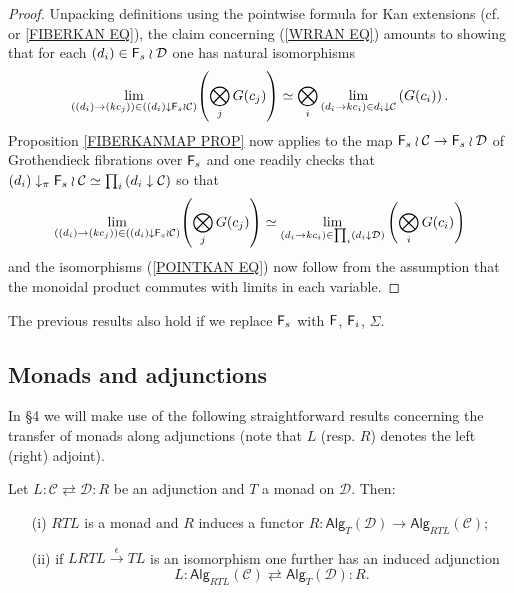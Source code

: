 \documentclass[a4paper,10pt]{article}%
\begin{document}
\begin{proof}
	Unpacking definitions using the pointwise formula for Kan extensions (cf. \cite[X.3 Thm. 1]{McL} or \eqref{FIBERKAN EQ}), the claim concerning (\ref{WRRAN EQ}) amounts to showing that for each $(d_i) \in \mathsf{F}_s \wr \mathcal{D}$ one has natural isomorphisms
	\begin{equation}\label{POINTKAN EQ}
	\underset{((d_i) \to (kc_j))\in
	\left( (d_i) \downarrow \mathsf{F}_s \wr \mathcal{C} \right) }{\lim} {\left(\bigotimes_j{G(c_j)}\right)}
		\simeq	
	\bigotimes_i \underset{(d_i  \to kc_i) \in d_i \downarrow \mathcal{C}}{\lim}
	\left(G(c_i)\right).
	\end{equation}
Proposition \ref{FIBERKANMAP PROP} now applies to 
the map $\mathsf{F}_s \wr \mathcal{C} \to \mathsf{F}_s \wr \mathcal{D}$ of Grothendieck fibrations over $\mathsf{F}_s$ and one readily checks that
$(d_i)\downarrow_{\pi} \mathsf{F}_s \wr \mathcal{C} \simeq
\prod_{i}{(d_i\downarrow \mathcal{C})}
$
so that 
	\[
	\underset{((d_i) \to (kc_j))\in
	\left( (d_i)\downarrow \mathsf{F}_s \wr \mathcal{C} \right) }{\lim} {\left(\bigotimes_j{G(c_j)}\right)}
		\simeq	
	\underset{(d_i \to kc_i)\in
	\prod_{i} \left( {d_i \downarrow \mathcal{D}} \right)}{\lim}
	\left(\bigotimes_i{G(c_i)}\right)
	\]
and the isomorphisms (\ref{POINTKAN EQ}) now follow from the assumption that the monoidal product commutes with limits in each variable.
\end{proof}

\begin{remark}
      The previous results also hold if we replace $\mathsf{F}_s$ with $\mathsf{F}$, $\mathsf{F}_i$, $\Sigma$.
\end{remark}

\subsection{Monads and adjunctions}


In \S 4 we will make use of the following straightforward results concerning the transfer of monads along adjunctions
(note that $L$ (resp. $R$) denotes the left (right) adjoint).


\begin{proposition}\label{MONADADJ1 PROP}
Let
$
L \colon \mathcal{C} \rightleftarrows \mathcal{D} \colon R
$
be an adjunction and $T$ a monad on $\mathcal{D}$.
Then:
\begin{itemize}
\item[(i)] $RTL$ is a monad and $R$ induces a functor
$R \colon \mathsf{Alg}_T(\mathcal{D}) \to \mathsf{Alg}_{RTL}(\mathcal{C})$;
\item[(ii)] if $LRTL \xrightarrow{\epsilon} TL$ is an isomorphism one further has an induced adjunction
\[
L \colon \mathsf{Alg}_{RTL}(\mathcal{C})
	\rightleftarrows
\mathsf{Alg}_{T}(\mathcal{D}) \colon R.
\]
\end{itemize}
\end{proposition}
\end{document}
